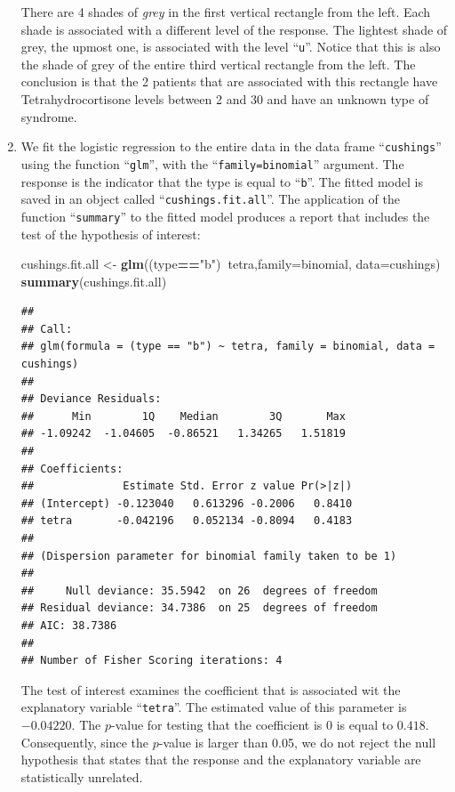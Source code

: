 \documentclass[]{krantz}
\makeatletter
\newenvironment{Shaded}{\begin{snugshade}}{\end{snugshade}}
\newcommand{\DataTypeTok}[1]{\textcolor[rgb]{0.13,0.29,0.53}{#1}}
\newcommand{\KeywordTok}[1]{\textcolor[rgb]{0.13,0.29,0.53}{\textbf{#1}}}
\newcommand{\NormalTok}[1]{#1}
\newcommand{\OperatorTok}[1]{\textcolor[rgb]{0.81,0.36,0.00}{\textbf{#1}}}
\newcommand{\StringTok}[1]{\textcolor[rgb]{0.31,0.60,0.02}{#1}}
\newenvironment{kframe}{%
\medskip{}
\setlength{\fboxsep}{.8em}
 \def\at@end@of@kframe{}%
 \ifinner\ifhmode%
  \def\at@end@of@kframe{\end{minipage}}%
  \begin{minipage}{\columnwidth}%
 \fi\fi%
 \def\FrameCommand##1{\hskip\@totalleftmargin \hskip-\fboxsep
 \colorbox{shadecolor}{##1}\hskip-\fboxsep
     \hskip-\linewidth \hskip-\@totalleftmargin \hskip\columnwidth}%
 \MakeFramed {\advance\hsize-\width
   \@totalleftmargin\z@ \linewidth\hsize
   \@setminipage}}%
 {\par\unskip\endMakeFramed%
 \at@end@of@kframe}
\renewenvironment{Shaded}{\begin{kframe}}{\end{kframe}}
\theoremstyle{definition}
\theoremstyle{definition}
\theoremstyle{definition}
\theoremstyle{remark}
\makeatother
\begin{document}
\begin{enumerate}
  There are 4 shades of \emph{grey} in the first vertical rectangle from the
  left. Each shade is associated with a different level of the response.
  The lightest shade of grey, the upmost one, is associated with the level
  ``\texttt{u}''. Notice that this is also the shade of grey of the entire third
  vertical rectangle from the left. The conclusion is that the 2 patients
  that are associated with this rectangle have Tetrahydrocortisone levels
  between 2 and 30 and have an unknown type of syndrome.
\item
  We fit the logistic regression to
  the entire data in the data frame ``\texttt{cushings}'' using the function
  ``\texttt{glm}'', with the ``\texttt{family=binomial}'' argument. The response is the
  indicator that the type is equal to ``\texttt{b}''. The fitted model is saved in
  an object called ``\texttt{cushings.fit.all}''. The application of the function
  ``\texttt{summary}'' to the fitted model produces a report that includes the test
  of the hypothesis of interest:

\begin{Shaded}
\begin{Highlighting}[]
\NormalTok{cushings.fit.all <-}\StringTok{ }\KeywordTok{glm}\NormalTok{((type}\OperatorTok{==}\StringTok{"b"}\NormalTok{)}\OperatorTok{~}\NormalTok{tetra,}\DataTypeTok{family=}\NormalTok{binomial, }\DataTypeTok{data=}\NormalTok{cushings)}
\KeywordTok{summary}\NormalTok{(cushings.fit.all)}
\end{Highlighting}
\end{Shaded}

\begin{verbatim}
## 
## Call:
## glm(formula = (type == "b") ~ tetra, family = binomial, data = cushings)
## 
## Deviance Residuals: 
##      Min        1Q    Median        3Q       Max  
## -1.09242  -1.04605  -0.86521   1.34265   1.51819  
## 
## Coefficients:
##              Estimate Std. Error z value Pr(>|z|)
## (Intercept) -0.123040   0.613296 -0.2006   0.8410
## tetra       -0.042196   0.052134 -0.8094   0.4183
## 
## (Dispersion parameter for binomial family taken to be 1)
## 
##     Null deviance: 35.5942  on 26  degrees of freedom
## Residual deviance: 34.7386  on 25  degrees of freedom
## AIC: 38.7386
## 
## Number of Fisher Scoring iterations: 4
\end{verbatim}

  The test of interest examines the coefficient that is associated wit the
  explanatory variable ``\texttt{tetra}''. The estimated value of this parameter is
  \(-0.04220\). The \(p\)-value for testing that the coefficient is 0 is equal
  to \(0.418\). Consequently, since the \(p\)-value is larger than 0.05, we do
  not reject the null hypothesis that states that the response and the
  explanatory variable are statistically unrelated.


\end{enumerate}
\end{document}
